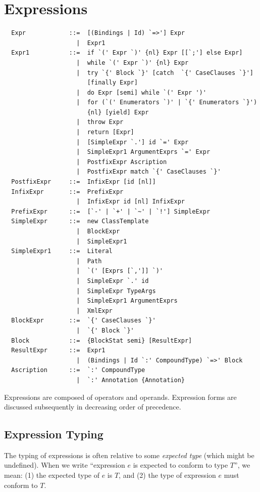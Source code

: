 \chapter{Expressions}
\label{sec:exprs}

\syntax\begin{lstlisting}
  Expr            ::=  [(Bindings | Id) `=>'] Expr
                    |  Expr1
  Expr1           ::=  if `(' Expr `)' {nl} Expr [[`;'] else Expr]
                    |  while `(' Expr `)' {nl} Expr
                    |  try `{' Block `}' [catch  `{' CaseClauses `}'] 
                       [finally Expr]
                    |  do Expr [semi] while `(' Expr ')'
                    |  for (`(' Enumerators `)' | `{' Enumerators `}') 
                       {nl} [yield] Expr
                    |  throw Expr
                    |  return [Expr]
                    |  [SimpleExpr `.'] id `=' Expr
                    |  SimpleExpr1 ArgumentExprs `=' Expr
                    |  PostfixExpr Ascription
                    |  PostfixExpr match `{' CaseClauses `}'
  PostfixExpr     ::=  InfixExpr [id [nl]]
  InfixExpr       ::=  PrefixExpr
                    |  InfixExpr id [nl] InfixExpr
  PrefixExpr      ::=  [`-' | `+' | `~' | `!'] SimpleExpr 
  SimpleExpr      ::=  new ClassTemplate
                    |  BlockExpr
                    |  SimpleExpr1
  SimpleExpr1     ::=  Literal
                    |  Path
                    |  `(' [Exprs [`,']] `)'
                    |  SimpleExpr `.' id 
                    |  SimpleExpr TypeArgs
                    |  SimpleExpr1 ArgumentExprs
                    |  XmlExpr
  BlockExpr       ::=  `{' CaseClauses `}'
                    |  `{' Block `}'
  Block           ::=  {BlockStat semi} [ResultExpr]
  ResultExpr      ::=  Expr1
                    |  (Bindings | Id `:' CompoundType) `=>' Block
  Ascription      ::=  `:' CompoundType
                    |  `:' Annotation {Annotation} 
\end{lstlisting}

Expressions are composed of operators and operands. Expression forms are
discussed subsequently in decreasing order of precedence. 

\section{Expression Typing}\label{sec:expr-typing}

The typing of expressions is often relative to some {\em expected
type} (which might be undefined).  
When we write ``expression $e$ is expected to conform to
type $T$'', we mean: (1) the expected type of $e$ is
$T$, and (2) the type of expression $e$ must conform to
$T$.

